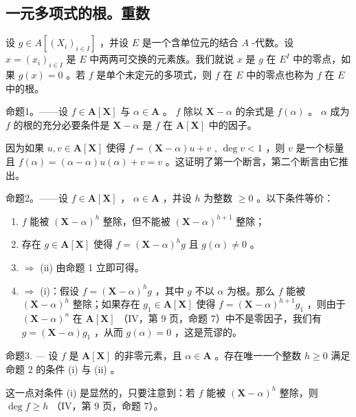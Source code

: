 \subsection{一元多项式的根。重数}

设 \(g \in A[(X_i)_{i \in I}]\) ，并设 \(E\) 是一个含单位元的结合 \(A\) -代数。设 \(x = (x_i)_{i \in I}\) 是 \(E\) 中两两可交换的元素族。我们就说 \(x\) 是 \(g\) 在 \(E^{I}\) 中的零点，如果 \(g(x) = 0\) 。若 \(f\) 是单个未定元的多项式，则 \(f\) 在 \(E\) 中的零点也称为 \(f\) 在 \(E\) 中的根。

命题1。——设 \(f \in \mathbf{A}[\mathbf{X}]\) 与 \(\alpha \in \mathbf{A}\) 。 \(f\) 除以 \(\mathbf{X} - \alpha\) 的余式是 \(f(\alpha)\) 。 \(\alpha\) 成为 \(f\) 的根的充分必要条件是 \(\mathbf{X} - \alpha\) 是 \(f\) 在 \(\mathbf{A}[\mathbf{X}]\) 中的因子。

因为如果 \(u, v \in \mathbf{A}[\mathbf{X}]\) 使得 \(f = (\mathbf{X} - \alpha)u + v\) , \(\deg v < 1\) ，则 \(v\) 是一个标量且 \(f(\alpha) = (\alpha - \alpha)u(\alpha) + v = v\) 。这证明了第一个断言，第二个断言由它推出。

命题2。——设 \(f \in \mathbf{A}[\mathbf{X}]\) ， \(\alpha \in \mathbf{A}\) ，并设 \(h\) 为整数 \(\geqslant 0\) 。以下条件等价：

\begin{enumerate}
\def\labelenumi{(\roman{enumi})}
\item
  \(f\) 能被 \((\mathbf{X} - \alpha)^h\) 整除，但不能被 \((\mathbf{X} - \alpha)^{h + 1}\) 整除；
\item
  存在 \(g \in \mathbf{A}[\mathbf{X}]\) 使得 \(f = (\mathbf{X} - \alpha)^h g\) 且 \(g(\alpha) \neq 0\) 。
\item
  \(\Rightarrow\) (ii) 由命题 1 立即可得。
\item
  \(\Rightarrow\) (i)：假设 \(f = (\mathbf{X} - \alpha)^h g\) ，其中 \(g\) 不以 \(\alpha\) 为根。那么 \(f\) 能被 \((\mathbf{X} - \alpha)^h\) 整除；如果存在 \(g_1 \in \mathbf{A}[\mathbf{X}]\) 使得 \(f = (\mathbf{X} - \alpha)^{h + 1}g_1\) ，则由于 \((\mathbf{X} - \alpha)^n\) 在 \(\mathbf{A}[\mathbf{X}]\) （IV，第 9 页，命题 7）中不是零因子，我们有 \(g = (\mathbf{X} - \alpha)g_1\) ，从而 \(g(\alpha) = 0\) ，这是荒谬的。
\end{enumerate}

命题3. --- 设 \(f\) 是 \(\mathbf{A}[\mathbf{X}]\) 的非零元素，且 \(\alpha \in \mathbf{A}\) 。存在唯一一个整数 \(h \geqslant 0\) 满足命题 2 的条件 (i) 与 (ii) 。

这一点对条件 (i) 是显然的，只要注意到：若 \(f\) 能被 \((\mathbf{X} - \alpha)^h\) 整除，则 \(\deg f \geqslant h\) （IV，第 9 页，命题 7）。

